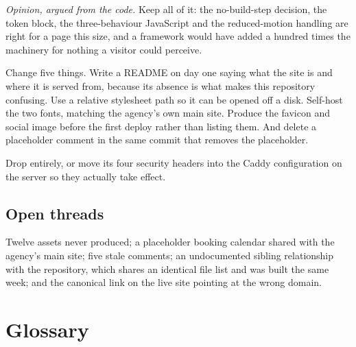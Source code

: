 \documentclass[11pt,a4paper]{article}
\begin{document}
\emph{Opinion, argued from the code.} Keep all of it: the no-build-step decision,
the token block, the three-behaviour JavaScript and the reduced-motion handling
are right for a page this size, and a framework would have added a hundred times
the machinery for nothing a visitor could perceive.

Change five things. Write a README on day one saying what the site is and where it
is served from, because its absence is what makes this repository confusing. Use a
relative stylesheet path so it can be opened off a disk. Self-host the two fonts,
matching the agency's own main site. Produce the favicon and social image before
the first deploy rather than listing them. And delete a placeholder comment in the
same commit that removes the placeholder.

Drop  entirely, or move its four security headers into the
Caddy configuration on the server so they actually take effect.

\subsection{Open threads}

Twelve assets never produced; a placeholder booking calendar shared with the
agency's main site; five stale  comments; an undocumented sibling
relationship with the  repository, which shares an identical
file list and was built the same week; and the canonical link on the live site
pointing at the wrong domain.

\section{Glossary}
\end{document}
